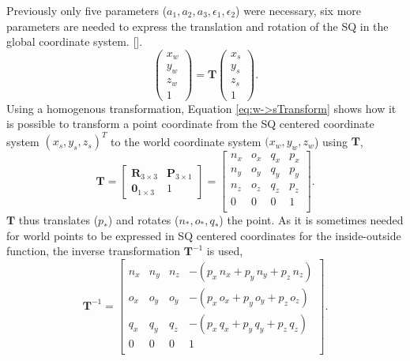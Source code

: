 Previously only five parameters ($a_1, a_2, a_3, \epsilon_1, \epsilon_2$) were necessary, six more parameters are needed to express the translation and rotation of the \gls{SQ} in the global coordinate system. [\citeauthor{Jaklic2000}]. 
\begin{equation}
\begin{pmatrix}
x_w \\ y_w \\ z_w \\ 1
\end{pmatrix} = \textbf{T} \begin{pmatrix}
x_s \\ y_s \\ z_s \\ 1
\end{pmatrix}.
\label{eq:w->sTransform}
\end{equation}
Using a homogenous transformation, Equation \ref{eq:w->sTransform} shows how it is possible to transform a point coordinate from the \gls{SQ} centered coordinate system $(x_s, y_s, z_s)^T$ to the world coordinate system $(x_w, y_w, z_w$) using $\textbf{T}$,
\begin{equation}
\textbf{T} =
\begin{bmatrix}
\textbf{R}_{3 \times 3} & \textbf{P}_{3 \times 1} \\
\textbf{0}_{1 \times 3} & 1
\end{bmatrix} = \begin{bmatrix}
n_x & o_x & q_x & p_x \\
n_y & o_y & q_y & p_y \\
n_z & o_z & q_z & p_z \\
0 & 0 & 0 & 1 \\
\end{bmatrix}.
\label{eq:T_withNotation}
\end{equation}
$\textbf{T}$ thus translates ($p_*$) and rotates ($n_*, o_*, q_*$) the point. As it is sometimes needed for world points to be expressed in \gls{SQ} centered coordinates for the inside-outside function, the inverse transformation $\textbf{T}^{-1}$ is used,
\begin{equation}
\textbf{T}^{-1} = \begin{bmatrix}
n_x & n_y & n_z & -(p_x\,n_x + p_y\,n_y + p_z\,n_z) \\
o_x & o_y & o_y & -(p_x\,o_x + p_y\,o_y + p_z\,o_z) \\
q_x & q_y & q_z & -(p_x\,q_x + p_y\,q_y + p_z\,q_z) \\
0 & 0 & 0 & 1 \\
\end{bmatrix}.
\label{eq:T-inv}
\end{equation}

